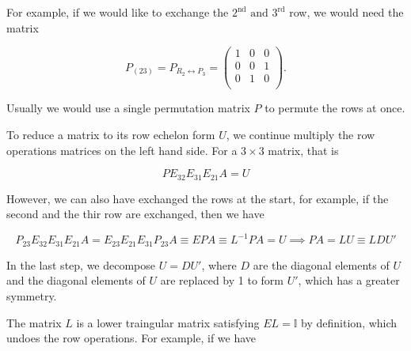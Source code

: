 \documentclass[a4paper,12pt]{report}
\begin{document}
For example, if we would like to exchange the \(2^{\text{nd}} \text { and } 3^{\text{rd}}\) row, we would need the matrix 

\begin{equation}
    P_{(23)} = P_{R_{2} \leftrightarrow P_{3}  } = \begin{pmatrix}
        1 & 0 &  0 \\
        0 & 0 &  1 \\
        0 & 1 &  0 \\
    \end{pmatrix}.
\end{equation}

Usually we would use a single permutation matrix \(P\) to permute the rows at once.

To reduce a matrix to its row echelon form \(U\), we continue multiply the row operations matrices on the left hand side. For a \(3 \times 3\) matrix, that is 

\begin{equation}
    PE_{32}E_{31}E_{21}A = U
\end{equation}

However, we can also have exchanged the rows at the start, for example, if the second and the thir row are exchanged, then we have 

\begin{equation}
    P_{23}E_{32}E_{31}E_{21}A = E_{23}E_{21}E_{31}P_{23}A \equiv EPA \equiv L^{-1} PA = U \implies PA=LU \equiv LDU'     
\end{equation}

In the last step, we decompose \(U = DU'\), where \(D\) are the diagonal elements of \(U\) and the diagonal elements of \(U\) are replaced by 1 to form \(U'\), which has a greater symmetry.  

The matrix \(L\) is a lower traingular matrix satisfying \(EL = \mathbb{I}\) by definition, which undoes the row operations. For example, if we have 
\end{document}

